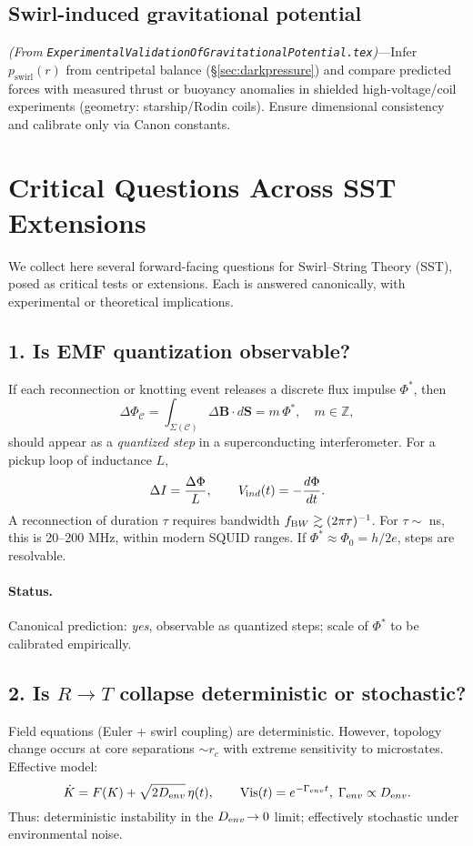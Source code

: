 \documentclass[11pt]{article}
\begin{document}
\subsection*{Swirl-induced gravitational potential}
    \textit{(From \texttt{ExperimentalValidationOfGravitationalPotential.tex})}—Infer $p_{\text{swirl}}(r)$ from centripetal balance (\S\ref{sec:darkpressure}) and compare predicted forces with measured thrust or buoyancy anomalies in shielded high-voltage/coil experiments (geometry: starship/Rodin coils). Ensure dimensional consistency and calibrate only via Canon constants.

\section{Critical Questions Across SST Extensions}
\label{sec:critical-questions}
We collect here several forward-facing questions for Swirl–String Theory (SST), posed as critical tests or extensions. Each is answered canonically, with experimental or theoretical implications.

\subsection*{1. Is EMF quantization observable?}
    If each reconnection or knotting event releases a discrete flux impulse $\Phi^*$, then
    \[
        \Delta \Phi_{\mathcal{C}} = \int_{\Sigma(\mathcal{C})} \Delta \mathbf{B} \cdot d\mathbf{S} = m\,\Phi^*,\quad m\in\mathbb Z,
    \]
    should appear as a \emph{quantized step} in a superconducting interferometer.
    For a pickup loop of inductance $L$,
    \[
        \Delta I=\frac{\Delta\Phi}{L},\qquad V_{\textrm ind}(t)=-\frac{d\Phi}{dt}.
    \]
    A reconnection of duration $\tau$ requires bandwidth $f_{\textrm BW}\gtrsim (2\pi\tau)^{-1}$. For $\tau\sim$ ns, this is 20--200 MHz, within modern SQUID ranges. If $\Phi^*\approx\Phi_0=h/2e$, steps are resolvable.

    \paragraph{Status.} Canonical prediction: \emph{yes}, observable as quantized steps; scale of $\Phi^*$ to be calibrated empirically.

\subsection*{2. Is $R\!\to\!T$ collapse deterministic or stochastic?}
Field equations (Euler + swirl coupling) are deterministic. However, topology change occurs at core separations $\sim r_c$ with extreme sensitivity to microstates. Effective model:
\[
    \dot K=F(K)+\sqrt{2D_{\textrm env}}\,\eta(t),\qquad \text{Vis}(t)=e^{-\Gamma_{\textrm env} t},\;\Gamma_{\textrm env}\propto D_{\textrm env}.
\]
Thus: deterministic instability in the $D_{\textrm env}\!\to 0$ limit; effectively stochastic under environmental noise.
\end{document}
